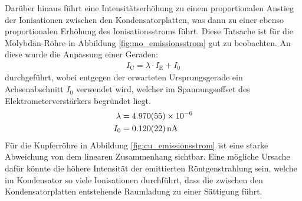 \documentclass[11pt, a4paper]{article}
\numberwithin{equation}{section}
\begin{document}
Darüber hinaus führt eine Intensitätserhöhung zu einem proportionalen Anstieg der Ionisationen zwischen den Kondensatorplatten, was dann zu einer ebenso proportionalen Erhöhung des Ionisationsstroms führt.
Diese Tatsache ist für die Molybdän-Röhre in Abbildung \ref{fig:mo_emissionsstrom} gut zu beobachten.
An diese wurde die Anpassung einer Geraden:
\begin{align}
	I_\mathrm{C} = \lambda \cdot I_\mathrm{E} + I_0
\end{align}
durchgeführt, wobei entgegen der erwarteten Ursprungsgerade ein Achsenabschnitt $I_0$ verwendet wird, welcher im Spannungsoffset des Elektrometerverstärkers begründet liegt.
\begin{align*}
	\lambda &= \num{4.970 +- 0.055e-6}\\
	I_0 &= \SI{0.120 +- 0.022}{nA}
\end{align*}
Für die Kupferröhre in Abbildung \ref{fig:cu_emissionsstrom} ist eine starke Abweichung von dem linearen Zusammenhang sichtbar.
Eine mögliche Ursache dafür könnte die höhere Intensität der emittierten Röntgenstrahlung sein, welche im Kondensator so viele Ionisationen durchführt, dass die zwischen den Kondensatorplatten entstehende Raumladung zu einer Sättigung führt.
\end{document}
